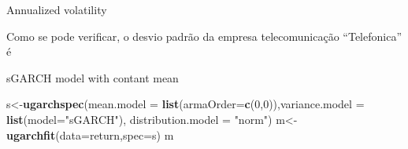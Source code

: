 \documentclass[
  12pt,
  a4paper,
  openany]{book}
\newenvironment{Shaded}{\begin{snugshade}}{\end{snugshade}}
\newcommand{\DataTypeTok}[1]{\textcolor[rgb]{0.13,0.29,0.53}{#1}}
\newcommand{\DecValTok}[1]{\textcolor[rgb]{0.00,0.00,0.81}{#1}}
\newcommand{\KeywordTok}[1]{\textcolor[rgb]{0.13,0.29,0.53}{\textbf{#1}}}
\newcommand{\NormalTok}[1]{#1}
\newcommand{\StringTok}[1]{\textcolor[rgb]{0.31,0.60,0.02}{#1}}
\begin{document}
\normalsize

Annualized volatility
\scriptsize

\normalsize

Como se pode verificar, o desvio padrão da empresa telecomunicação ``Telefonica'' é

sGARCH model with contant mean

\begin{Shaded}
\begin{Highlighting}[]
\NormalTok{s\textless{}{-}}\KeywordTok{ugarchspec}\NormalTok{(}\DataTypeTok{mean.model =} \KeywordTok{list}\NormalTok{(}\DataTypeTok{armaOrder=}\KeywordTok{c}\NormalTok{(}\DecValTok{0}\NormalTok{,}\DecValTok{0}\NormalTok{)),}\DataTypeTok{variance.model =} \KeywordTok{list}\NormalTok{(}\DataTypeTok{model=}\StringTok{"sGARCH"}\NormalTok{),}
              \DataTypeTok{distribution.model =} \StringTok{"norm"}\NormalTok{)}
\NormalTok{m\textless{}{-}}\KeywordTok{ugarchfit}\NormalTok{(}\DataTypeTok{data=}\NormalTok{return,}\DataTypeTok{spec=}\NormalTok{s)}
\NormalTok{m}
\end{Highlighting}
\end{Shaded}
\end{document}
